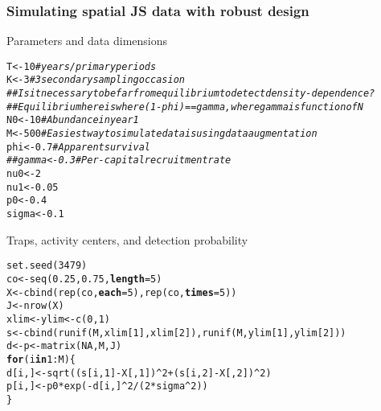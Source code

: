 \documentclass[color=usenames,dvipsnames]{beamer}\usepackage[]{graphicx}\usepackage[]{color}
\makeatletter
\newcommand{\hlnum}[1]{\textcolor[rgb]{0.69,0.494,0}{#1}}%
\newcommand{\hlcom}[1]{\textcolor[rgb]{0.514,0.506,0.514}{\textit{#1}}}%
\newcommand{\hlopt}[1]{\textcolor[rgb]{0,0,0}{#1}}%
\newcommand{\hlstd}[1]{\textcolor[rgb]{0,0,0}{#1}}%
\newcommand{\hlkwa}[1]{\textcolor[rgb]{0,0,0}{\textbf{#1}}}%
\newcommand{\hlkwb}[1]{\textcolor[rgb]{0,0.341,0.682}{#1}}%
\newcommand{\hlkwc}[1]{\textcolor[rgb]{0,0,0}{\textbf{#1}}}%
\newcommand{\hlkwd}[1]{\textcolor[rgb]{0.004,0.004,0.506}{#1}}%
\newenvironment{kframe}{%
 \def\at@end@of@kframe{}%
 \ifinner\ifhmode%
  \def\at@end@of@kframe{\end{minipage}}%
  \begin{minipage}{\columnwidth}%
 \fi\fi%
 \def\FrameCommand##1{\hskip\@totalleftmargin \hskip-\fboxsep
 \colorbox{shadecolor}{##1}\hskip-\fboxsep
     \hskip-\linewidth \hskip-\@totalleftmargin \hskip\columnwidth}%
 \MakeFramed {\advance\hsize-\width
   \@totalleftmargin\z@ \linewidth\hsize
   \@setminipage}}%
 {\par\unskip\endMakeFramed%
 \at@end@of@kframe}
\newenvironment{knitrout}{}{} %
\makeatother
\begin{document}
\begin{frame}[fragile]
  \frametitle{Simulating spatial JS data with robust design}
  \scriptsize %
  {Parameters and data dimensions}
\begin{knitrout}
\color{fgcolor}\begin{kframe}
\begin{alltt}
\hlstd{T} \hlkwb{<-} \hlnum{10}      \hlcom{# years/primary periods}
\hlstd{K} \hlkwb{<-} \hlnum{3}       \hlcom{# 3 secondary sampling occasion}
\hlcom{## Is it necessary to be far from equilibrium to detect density-dependence?}
\hlcom{## Equilibrium here is where (1-phi) == gamma, where gamma is function of N}
\hlstd{N0} \hlkwb{<-} \hlnum{10}     \hlcom{# Abundance in year 1}
\hlstd{M} \hlkwb{<-} \hlnum{500}     \hlcom{# Easiest way to simulate data is using data augmentation}
\hlstd{phi} \hlkwb{<-} \hlnum{0.7}   \hlcom{# Apparent survival}
\hlcom{##gamma <- 0.3 # Per-capital recruitment rate}
\hlstd{nu0} \hlkwb{<-} \hlnum{2}
\hlstd{nu1} \hlkwb{<-} \hlnum{0.05}
\hlstd{p0} \hlkwb{<-} \hlnum{0.4}
\hlstd{sigma} \hlkwb{<-} \hlnum{0.1}
\end{alltt}
\end{kframe}
\end{knitrout}
\pause
{Traps, activity centers, and detection probability}
\begin{knitrout}
\color{fgcolor}\begin{kframe}
\begin{alltt}
\hlkwd{set.seed}\hlstd{(}\hlnum{3479}\hlstd{)}
\hlstd{co} \hlkwb{<-} \hlkwd{seq}\hlstd{(}\hlnum{0.25}\hlstd{,} \hlnum{0.75}\hlstd{,} \hlkwc{length}\hlstd{=}\hlnum{5}\hlstd{)}
\hlstd{X} \hlkwb{<-} \hlkwd{cbind}\hlstd{(}\hlkwd{rep}\hlstd{(co,} \hlkwc{each}\hlstd{=}\hlnum{5}\hlstd{),} \hlkwd{rep}\hlstd{(co,} \hlkwc{times}\hlstd{=}\hlnum{5}\hlstd{))}
\hlstd{J} \hlkwb{<-} \hlkwd{nrow}\hlstd{(X)}
\hlstd{xlim} \hlkwb{<-} \hlstd{ylim} \hlkwb{<-} \hlkwd{c}\hlstd{(}\hlnum{0}\hlstd{,}\hlnum{1}\hlstd{)}
\hlstd{s} \hlkwb{<-} \hlkwd{cbind}\hlstd{(}\hlkwd{runif}\hlstd{(M, xlim[}\hlnum{1}\hlstd{], xlim[}\hlnum{2}\hlstd{]),} \hlkwd{runif}\hlstd{(M, ylim[}\hlnum{1}\hlstd{], ylim[}\hlnum{2}\hlstd{]))}
\hlstd{d} \hlkwb{<-} \hlstd{p} \hlkwb{<-} \hlkwd{matrix}\hlstd{(}\hlnum{NA}\hlstd{, M, J)}
\hlkwa{for}\hlstd{(i} \hlkwa{in} \hlnum{1}\hlopt{:}\hlstd{M) \{}
    \hlstd{d[i,]} \hlkwb{<-} \hlkwd{sqrt}\hlstd{((s[i,}\hlnum{1}\hlstd{]}\hlopt{-}\hlstd{X[,}\hlnum{1}\hlstd{])}\hlopt{^}\hlnum{2} \hlopt{+} \hlstd{(s[i,}\hlnum{2}\hlstd{]}\hlopt{-}\hlstd{X[,}\hlnum{2}\hlstd{])}\hlopt{^}\hlnum{2}\hlstd{)}
    \hlstd{p[i,]} \hlkwb{<-} \hlstd{p0}\hlopt{*}\hlkwd{exp}\hlstd{(}\hlopt{-}\hlstd{d[i,]}\hlopt{^}\hlnum{2}\hlopt{/}\hlstd{(}\hlnum{2}\hlopt{*}\hlstd{sigma}\hlopt{^}\hlnum{2}\hlstd{))}
\hlstd{\}}
\end{alltt}
\end{kframe}
\end{knitrout}
\end{frame}
\end{document}
